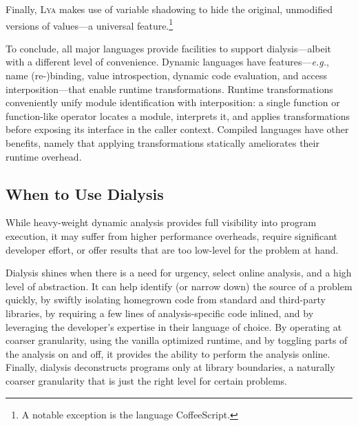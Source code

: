 \documentclass[letterpaper,twocolumn,10pt]{article}
\def\eg{{\em e.g.}, }
\def\ie{{\em i.e.}, }
\newcommand{\sys}{{\scshape Lya}\xspace}
\begin{document}
Finally, \sys makes use of variable shadowing to hide the original, unmodified versions of values---a universal feature.\footnote{
  A notable exception is the language CoffeeScript. %
}

To conclude, all major languages provide facilities to support dialysis---albeit with a different level of convenience.
Dynamic languages have features---\eg name (re-)binding, value introspection, dynamic code evaluation, and access interposition---that enable runtime transformations.
Runtime transformations conveniently unify module identification with interposition:
  a single function or function-like operator locates a module, interprets it, and applies transformations before exposing its interface in the caller context.
Compiled languages have other benefits, namely that applying transformations statically ameliorates their runtime overhead.


\subsection{When to Use Dialysis}
\label{principles}
While heavy-weight dynamic analysis provides full visibility into program execution, it may suffer from higher performance overheads, require significant developer effort, or offer results that are too low-level for the problem at hand.

Dialysis shines when there is a need for urgency, select online analysis, and a high level of abstraction.
It can help identify (or narrow down) the source of a problem quickly, by swiftly isolating homegrown code from standard and third-party libraries, by requiring a few lines of analysis-specific code inlined, and by leveraging the developer's expertise in their language of choice.
By operating at coarser granularity, using the vanilla optimized runtime, and by toggling parts of the analysis on and off, it provides the ability to perform the analysis online.
Finally, dialysis deconstructs programs only at library boundaries, a naturally coarser granularity that is just the right level for certain problems.
\end{document}
